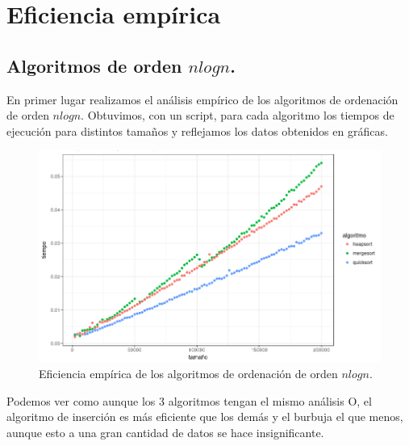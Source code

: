 \documentclass[a4paper, 11pt]{article}
\begin{document}
\renewcommand{\abstractname}{Resumen} %


\color{darkGray}
{\parskip=2pt
  \tableofcontents
}
\pagebreak
\section{Eficiencia empírica}
\subsection{Algoritmos de orden $nlogn$.}
En primer lugar realizamos el análisis empírico de los algoritmos de ordenación de orden $nlogn$. Obtuvimos, con un script, para cada algoritmo los tiempos de ejecución para distintos tamaños y reflejamos los datos obtenidos en gráficas.

\begin{figure}[!hbp]
	 \includegraphics[width=\textwidth]{ordempirica.png}
	\caption{Eficiencia empírica de los algoritmos de ordenación de orden $nlogn$.\label{empiricaor}}
\end{figure}


    Podemos ver como aunque los 3 algoritmos tengan el mismo análisis O, el algoritmo de inserción es más eficiente que los demás y el burbuja el que menos, aunque esto a una gran cantidad de datos se hace insignificante.
\pagebreak
\end{document}

